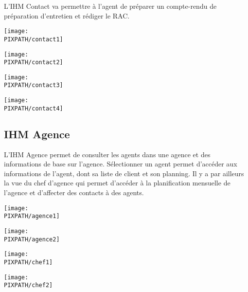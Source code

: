 L'IHM Contact va permettre à l'agent de préparer un compte-rendu de préparation
d'entretien et rédiger le RAC.

\begin{center}
\texttt{[image: \\PIXPATH/contact1]}
\end{center}
\begin{center}
\texttt{[image: \\PIXPATH/contact2]}
\end{center}
\begin{center}
\texttt{[image: \\PIXPATH/contact3]}
\end{center}
\begin{center}
\texttt{[image: \\PIXPATH/contact4]}
\end{center}

\subsection{IHM Agence}

L'IHM Agence permet de consulter les agents dans une agence et des informations 
de base sur l'agence. Sélectionner un agent permet d'accéder aux informations 
de l'agent, dont sa liste de client et son planning. Il y a par ailleurs la vue 
du chef d'agence qui permet d'accéder à la planification mensuelle de l'agence 
et d'affecter des contacts à des agents. 

\begin{center}
\texttt{[image: \\PIXPATH/agence1]}
\end{center}
\begin{center}
\texttt{[image: \\PIXPATH/agence2]}
\end{center}
\begin{center}
\texttt{[image: \\PIXPATH/chef1]}
\end{center}
\begin{center}
\texttt{[image: \\PIXPATH/chef2]}
\end{center}



